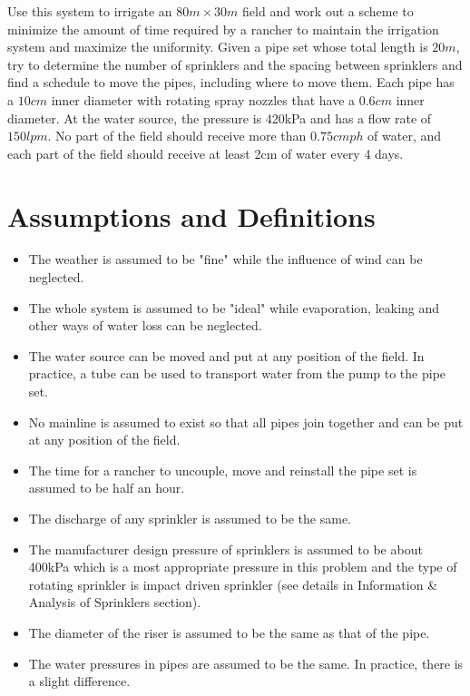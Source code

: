 \documentclass[12pt,a4paper,titlepage]{article}
\begin{document}
Use this system to irrigate an $80m\times30m$ field and work out a
scheme to minimize the amount of time required by a rancher to
maintain the irrigation system and maximize the uniformity. Given
a pipe set whose total length is $20m$, try to determine the
number of sprinklers and the spacing between sprinklers and find a
schedule to move the pipes, including where to move them. Each
pipe has a $10cm$ inner diameter with rotating spray nozzles that
have a 0.6$cm$ inner diameter. At the water source, the pressure
is 420kPa and has a flow rate of $150lpm$. No part of the field
should receive more than $0.75cmph$ of water, and each part of the
field should receive at least 2cm of water every 4 days.

\section{Assumptions and Definitions}
\begin{itemize}
\item The weather is assumed to be "fine" while the influence of
wind can be neglected.

\item The whole system is assumed to be "ideal" while evaporation, leaking and other ways of water loss can be neglected.


\item The water source can be moved and put at any position of the field. In practice, a tube can be used to transport water from the pump to the pipe set.

\item No mainline is assumed to exist so that all pipes join together and can be put at any position of the field.

\item The time for a rancher to uncouple, move and reinstall the pipe set is assumed to be half an hour.

\item The discharge of any sprinkler is assumed to be the same.

\item The manufacturer design pressure of sprinklers is assumed to be about 400kPa which is a most appropriate pressure in this problem and the type of rotating sprinkler is impact driven sprinkler (see details in Information & Analysis of Sprinklers section).

\item The diameter of the riser is assumed to be the same as that of the pipe.

\item The water pressures in pipes are assumed to be the same. In practice, there is a slight difference.

\end{itemize}
\end{document}
